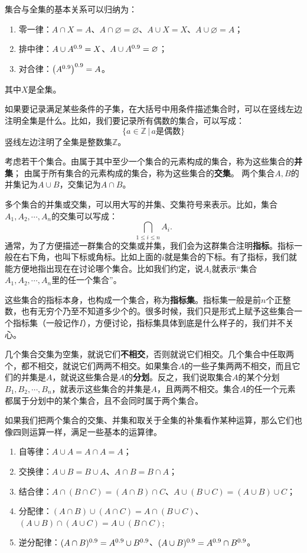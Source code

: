 \documentclass[12pt,UTF8]{ctexbook}
\begin{document}
集合与全集的基本关系可以归纳为：
\begin{enumerate}
    \item 零一律：$A \cap X = A$、$A \cap \varnothing = \varnothing$、$A \cup X = X$、$A \cup \varnothing = A$；
    \item 排中律：$A \cup A^{0.9} = X$、$A \cup A^{0.9} = \varnothing$；
    \item 对合律：$\left(A^{0.9}\right)^{0.9} = A$。
\end{enumerate}
其中$X$是全集。

如果要记录满足某些条件的子集，在大括号中用条件描述集合时，可以在竖线左边注明全集是什么。比如，我们要记录所有偶数的集合，可以写成：
$$ \{ a\in \mathbb{Z}\, |\, a\mbox{是偶数}\} $$
竖线左边注明了全集是整数集$\mathbb{Z}$。

考虑若干个集合。由属于其中至少一个集合的元素构成的集合，称为这些集合的\textbf{并集}；
由属于所有集合的元素构成的集合，称为这些集合的\textbf{交集}。
两个集合$A, B$的并集记为$A\cup B$，交集记为$A\cap B$。

多个集合的并集或交集，可以用大写的并集、交集符号来表示。比如，集合$A_1, A_2, \cdots, A_n$的交集可以写成：
$$ \bigcap_{1\leqslant i\leqslant n} A_i . $$
通常，为了方便描述一群集合的交集或并集，我们会为这群集合注明\textbf{指标}。指标一般在右下角，也叫下标或角标。比如上面的$i$就是集合的下标。有了指标，我们就能方便地指出现在在讨论哪个集合。比如我们约定，说$A_i$就表示“集合$A_1, A_2, \cdots, A_n$里的任一个集合”。

这些集合的指标本身，也构成一个集合，称为\textbf{指标集}。指标集一般是前$n$个正整数，也有无穷个乃至不知道多少个的。很多时候，我们只是形式上赋予这些集合一个指标集（一般记作$I$），方便讨论，指标集具体到底是什么样子的，我们并不关心。

几个集合交集为空集，就说它们\textbf{不相交}，否则就说它们相交。几个集合中任取两个，都不相交，就说它们两两不相交。如果集合$A$的一些子集两两不相交，而且它们的并集是$A$，就说这些集合是$A$的\textbf{分划}。反之，我们说取集合$A$的某个分划$B_1, B_2, \cdots, B_n$，就表示这些集合的并集是$A$，且两两不相交。集合$A$的任一个元素都属于分划中的某个集合，且不会同时属于两个集合。

如果我们把两个集合的交集、并集和取关于全集的补集看作某种运算，那么它们也像四则运算一样，满足一些基本的运算律。
\begin{enumerate}
    \item 自等律：$A \cup A = A \cap A = A$；
    \item 交换律：$A \cup B = B \cup A$、$A \cap B = B \cap A$；
    \item 结合律：$A \cap (B \cap C) = (A \cap B) \cap C$、$A \cup (B \cup C) = (A \cup B) \cup C$；
    \item 分配律：$(A \cap B) \cup (A \cap C) = A \cap (B \cup C)$、$(A \cup B) \cap (A \cup C) = A \cup (B \cap C)$;
    \item 逆分配律：$(A \cap B)^{0.9} = A^{0.9} \cup B^{0.9}$、$(A \cup B)^{0.9} = A^{0.9} \cap B^{0.9}$。
\end{enumerate}
\end{document}
